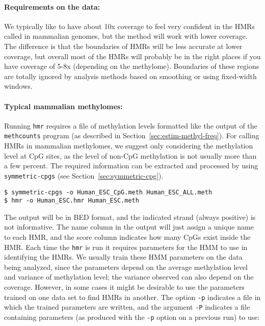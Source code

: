 \documentclass[10pt]{article}
\newcommand{\prog}[1]{\texttt{#1}}
\newcommand{\op}[1]{\texttt{#1}}
\begin{document}
\paragraph{Requirements on the data:}
We typically like to have about 10x coverage to feel very confident in
the HMRs called in mammalian genomes, but the method will work with
lower coverage. The difference is that the boundaries of HMRs will be
less accurate at lower coverage, but overall most of the HMRs will
probably be in the right places if you have coverage of 5-8x
(depending on the methylome). Boundaries of these regions are totally
ignored by analysis methods based on smoothing or using fixed-width
windows.

\paragraph{Typical mammalian methylomes:}
Running \prog{hmr} requires a file of methylation levels formatted
like the output of the \prog{methcounts} program (as described
in Section~\ref{sec:estim-methyl-freq}). 
For calling HMRs in mammalian methylomes, we suggest only
considering the methylation level at CpG sites, as the level of non-CpG
methylation is not usually more than a few percent. The required information
can be extracted and processed by using \texttt{symmetric-cpgs} 
(see Section~\ref{sec:symmetric-cpg}). 

\begin{verbatim}
$ symmetric-cpgs -o Human_ESC_CpG.meth Human_ESC_ALL.meth
$ hmr -o Human_ESC.hmr Human_ESC.meth
\end{verbatim}

The output will be in BED format, and the indicated strand (always
positive) is not informative. The name column in the output will just
assign a unique name to each HMR, and the score column indicates how
many CpGs exist inside the HMR. Each time the \prog{hmr} is run it
requires parameters for the HMM to use in identifying the HMRs. We
usually train these HMM parameters on the data being analyzed, since
the parameters depend on the average methylation level and variance of
methylation level; the variance observed can also depend on the
coverage. However, in some cases it might be desirable to use the
parameters trained on one data set to find HMRs in another. The option
\op{-p} indicates a file in which the trained parameters are written,
and the argument \op{-P} indicates a file containing parameters (as
produced with the \op{-p} option on a previous run) to use:
\end{document}
